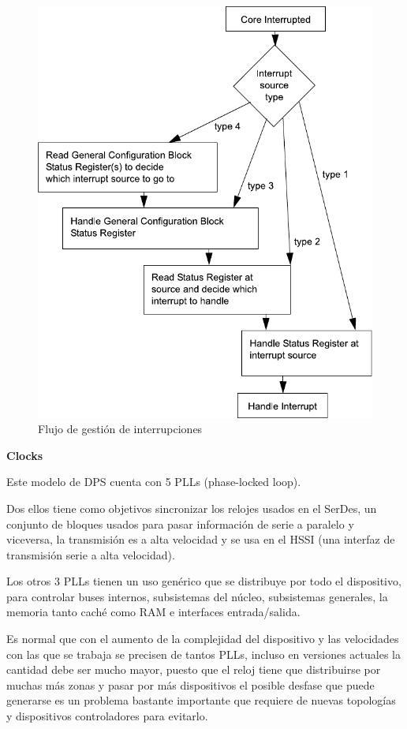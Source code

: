 \documentclass[11pt,a4paper]{article}
\begin{document}
\begin{figure}[H]
    \centering
    \includegraphics[scale=0.85]{images/diagram_flow.pdf}
    \caption{Flujo de gestión de interrupciones}
    \label{fig:interrupt_handling_flow}
\end{figure}

{\Large \textbf{Clocks}}

Este modelo de DPS cuenta con 5 PLLs (phase-locked loop).

Dos ellos tiene como objetivos sincronizar los relojes usados en el SerDes, un conjunto de bloques usados para pasar información de serie a paralelo y viceversa, la transmisión es a alta velocidad y se usa en el HSSI (una interfaz de transmisión serie a alta velocidad).

Los otros 3 PLLs tienen un uso genérico que se distribuye por todo el dispositivo, para controlar buses internos, subsistemas del núcleo, subsistemas generales, la memoria tanto caché como RAM e interfaces entrada/salida.

Es normal que con el aumento de la complejidad del dispositivo y las velocidades con las que se trabaja se precisen de tantos PLLs, incluso en versiones actuales la cantidad debe ser mucho mayor, puesto que el reloj tiene que distribuirse por muchas más zonas y pasar por más dispositivos el posible desfase que puede generarse es un problema bastante importante que requiere de nuevas topologías y dispositivos controladores para evitarlo.
\end{document}
